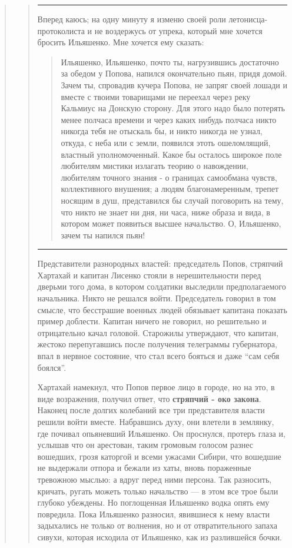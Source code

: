 \begin{quote}
\begin{quote}
\par\noindent\rule{\textwidth}{0.4pt}

Вперед каюсь; на одну минуту я изменю своей роли
летонисца-протоколиста и не воздержусь от упрека, который
мне хочется бросить Ильяшенко. Мне хочется ему сказать:

\begin{quote}
\em\bfseries
	
Ильяшенко, Ильяшенко, почто ты, нагрузившись достаточно за обедом у Попова,
напился окончательно пьян, придя домой. Зачем ты, спровадив кучера Попова, не
запряг своей лошади и вместе с твоими товарищами не переехал через реку
Кальмиус на Донскую сторону. Для этого надо было потерять менее полчаса времени
и через каких нибудь полчаса никто никогда тебя не отыскаль бы, и никто никогда
не узнал, откуда, с неба или с земли, появился этоть ошеломлящий, властный
уполномоченный. Какое бы осталось широкое поле любителям мистики излагать
теорию о навождении, любителям точного знания - о границах самообмана чувств,
коллективного внушения; а людям благонамеренным, трепет носящим в душ,
представился бы случай поговорить на тему, что никто не знает ни дня, ни часа,
ниже образа и вида, в котором может появиться высшее начальство. О, Ильяшенко,
зачем ты напился пьян!

\end{quote}

\par\noindent\rule{\textwidth}{0.4pt}

Представители разнородных властей: председатель Попов, стряпчий Хартахай и
капитан Лисенко стояли в нерешительности перед дверьми того дома, в котором
солдатики выследили предполагаемого начальника. Никто не решался войти.
Председатель говорил в том смысле, что бесстрашие военных людей обязывает
капитана показать пример доблести. Капитан ничего не говорил, но решительно и
отрицательно качал головой. Старожилы утверждают, что капитан, жестоко
перепугавшись после получения телеграммы губернатора, впал в нервное состояние,
что стал всего бояться и даже ``сам себя боялся''.

Хартахай намекнул, что Попов первое лицо в городе,
но на это, в виде возражения, получил ответ, что \textbf{стряпчий - око закона}.
Наконец после долгих колебаний все три представителя власти решили войти вместе.
Набравшись духу, они влетели в землянку, где почивал опьяневший Ильяшенко.
Он проснулся, протеръ глаза и, услышав что он
арестован, таким громовым голосом разнес вошедших,
грозя каторгой и всеми ужасами Сибири, что вошедшие не
выдержали отпора и бежали из хаты, вновь пораженные
тревожною мыслью: а вдруг перед ними персона. Так
разносить, кричать, ругать можеть только начальство — в
этом все трое были глубоко убеждены. Но поглощенная
Ильяшенко водка опять ему повредила. Пока Ильяшенко
разносил, явившиеся к нему власти задыхались не только
от волнения, но и от отвратительного запаха сивухи, которая 
исходила от Ильяшенко, как из разлившейся бочки.


\end{quote}
\end{quote}
